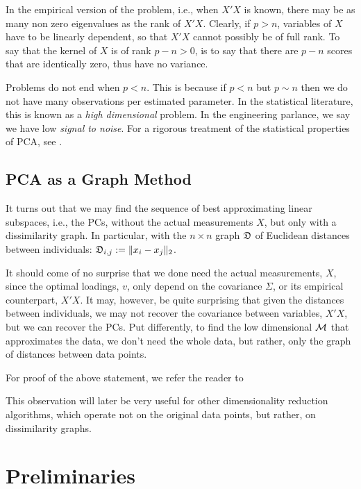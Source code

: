 \documentclass[12pt,a4paper]{article}
\begin{document}
In the empirical version of the problem, i.e., when $X'X$ is known, there may be as many non zero eigenvalues as the rank of $X'X$.
Clearly, if $p>n$, variables of $X$ have to be linearly dependent, so that $X'X$ cannot possibly be of full rank.
To say that the kernel of $X$ is of rank $p-n>0$, is to say that there are $p-n$ scores that are identically zero, thus have no variance. 


Problems do not end when $p<n$. 
This is because if $p<n$ but $p\sim n$ then we do not have many observations per estimated parameter. 
In the statistical literature, this is known as a \emph{high dimensional} problem. 
In the engineering parlance, we say we have low \emph{signal to noise}.
For a rigorous treatment of the statistical properties of PCA, see \cite{nadler2008finite}.
 





\subsection{PCA as a Graph Method}
\label{sec:pca_as_graph}

It turns out that we may find the sequence of best approximating linear subspaces, i.e., the PCs, without the actual measurements $X$, but only with a dissimilarity graph. 
In particular, with the $n\times n$ graph $\mathfrak{D}$ of Euclidean distances between individuals: $\mathfrak{D}_{i,j}:= \Vert x_i-x_j \Vert_2$. 

It should come of no surprise that we done need the actual measurements, $X$, since the optimal loadings, $v$, only depend on the covariance $\Sigma$, or its empirical counterpart, $X'X$. 
It may, however, be quite surprising that given the distances between individuals, we may not recover the covariance between variables, $X'X$, but we can recover the PCs. 
Put differently, to find the low dimensional $\mathcal{M}$ that approximates the data, we don't need the whole data, but rather, only the graph of distances between data points. 

For proof of the above statement, we refer the reader to \cite[Sec.18.5.2]{friedman2001elements}

This observation will later be very useful for other dimensionality reduction algorithms, which operate not on the original data points, but rather, on dissimilarity graphs. 





\section{Preliminaries}
\end{document}
